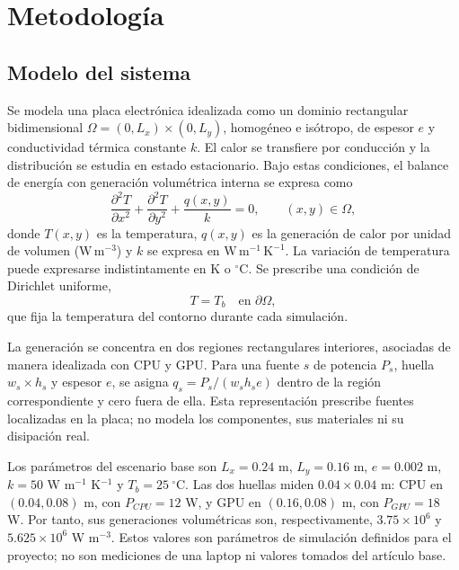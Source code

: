 \section{Metodolog\'ia}

\subsection{Modelo del sistema}

Se modela una placa electr\'onica idealizada como un dominio rectangular bidimensional $\Omega=(0,L_x)\times(0,L_y)$, homog\'eneo e is\'otropo, de espesor $e$ y conductividad t\'ermica constante $k$. El calor se transfiere por conducci\'on y la distribuci\'on se estudia en estado estacionario. Bajo estas condiciones, el balance de energ\'ia con generaci\'on volum\'etrica interna se expresa como
\begin{equation}
\frac{\partial^2 T}{\partial x^2}
+\frac{\partial^2 T}{\partial y^2}
+\frac{q(x,y)}{k}=0,\qquad (x,y)\in\Omega,
\label{eq:poisson-thermoplate}
\end{equation}
donde $T(x,y)$ es la temperatura, $q(x,y)$ es la generaci\'on de calor por unidad de volumen ($\mathrm{W\,m^{-3}}$) y $k$ se expresa en $\mathrm{W\,m^{-1}\,K^{-1}}$. La variaci\'on de temperatura puede expresarse indistintamente en K o $^\circ$C. Se prescribe una condici\'on de Dirichlet uniforme,
\begin{equation}
T=T_b \quad \text{en } \partial\Omega,
\label{eq:dirichlet}
\end{equation}
que fija la temperatura del contorno durante cada simulaci\'on.

La generaci\'on se concentra en dos regiones rectangulares interiores, asociadas de manera idealizada con CPU y GPU. Para una fuente $s$ de potencia $P_s$, huella $w_s\times h_s$ y espesor $e$, se asigna $q_s=P_s/(w_sh_se)$ dentro de la regi\'on correspondiente y cero fuera de ella. Esta representaci\'on prescribe fuentes localizadas en la placa; no modela los componentes, sus materiales ni su disipaci\'on real.

Los par\'ametros del escenario base son $L_x=0.24$ m, $L_y=0.16$ m, $e=0.002$ m, $k=50$ W m$^{-1}$ K$^{-1}$ y $T_b=25\ ^\circ$C. Las dos huellas miden $0.04\times0.04$ m: CPU en $(0.04,0.08)$ m, con $P_{CPU}=12$ W, y GPU en $(0.16,0.08)$ m, con $P_{GPU}=18$ W. Por tanto, sus generaciones volum\'etricas son, respectivamente, $3.75\times10^6$ y $5.625\times10^6$ W m$^{-3}$. Estos valores son par\'ametros de simulaci\'on definidos para el proyecto; no son mediciones de una laptop ni valores tomados del art\'iculo base.

